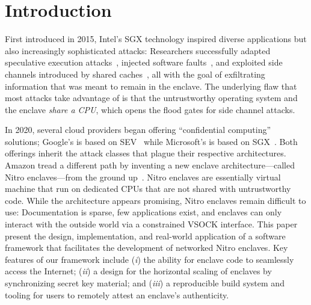 \section{Introduction}

First introduced in 2015, Intel's SGX technology inspired diverse applications
but also increasingly sophisticated attacks: Researchers successfully adapted
speculative execution attacks~\cite{VanBulck2018a}, injected software
faults~\cite{Murdock2020a}, and exploited side channels introduced by shared
caches~\cite{Brasser2017a}, all with the goal of exfiltrating information that
was meant to remain in the enclave.  The underlying flaw that most attacks take
advantage of is that the untrustworthy operating system and the enclave
\emph{share a CPU}, which opens the flood gates for side channel attacks.

In 2020, several cloud providers began offering ``confidential computing''
solutions; Google's is based on SEV~\cite{googlecc} while Microsoft's is based
on SGX~\cite{azurecc}.  Both offerings inherit the attack classes that plague
their respective architectures.  Amazon tread a different path by inventing a
new enclave architecture---called Nitro enclaves---from the ground
up~\cite{nitro-enclaves}.  Nitro enclaves are essentially virtual machine that
run on dedicated CPUs that are not shared with untrustworthy code.  While the
architecture appears promising, Nitro enclaves remain difficult to use:
Documentation is sparse, few applications exist, and enclaves can only interact
with the outside world via a constrained VSOCK interface.  This paper present
the design, implementation, and real-world application of a software framework
that facilitates the development of networked Nitro enclaves.  Key features of
our framework include
(\emph{i}) the ability for enclave code to seamlessly access the Internet;
(\emph{ii}) a design for the horizontal scaling of enclaves by synchronizing
secret key material; and
(\emph{iii}) a reproducible build system and tooling for users to remotely
attest an enclave's authenticity.

